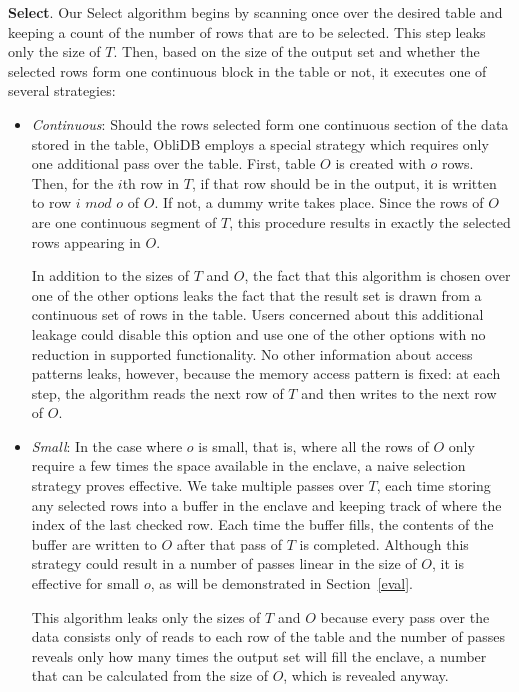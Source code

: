 \documentclass[letterpaper,twocolumn,10pt]{article}
\def\name/{ObliDB}
\begin{document}
  \noindent \textbf{Select}. 
Our Select algorithm begins by scanning once over the desired table and keeping a count of the number of rows that are to be selected. This step leaks only the size of $T$. Then, based on the size of the output set and whether the selected rows form one continuous block in the table or not, it executes one of several strategies:
\begin{itemize}[itemsep=0pt,parsep=0pt]
\item \textit{Continuous}: Should the rows selected form one continuous section of the data stored in the table, \name/ employs a special strategy which requires only one additional pass over the table. First, table $O$ is created with $o$ rows. Then, for the $i$th row in $T$, if that row should be in the output, it is written to row $i\textit{ mod }o$ of $O$. If not, a dummy write takes place. Since the rows of $O$ are one continuous segment of $T$, this procedure results in exactly the selected rows appearing in $O$. 

In addition to the sizes of $T$ and $O$, the fact that this algorithm is chosen over one of the other options leaks the fact that the result set is drawn from a continuous set of rows in the table. Users concerned about this additional leakage could disable this option and use one of the other options with no reduction in supported functionality. No other information about access patterns leaks, however, because the memory access pattern is fixed: at each step, the algorithm reads the next row of $T$ and then writes to the next row of $O$. 

\item \textit{Small}: In the case where $o$ is small, that is, where all the rows of $O$ only require a few times the space available in the enclave, a naive selection strategy proves effective. We take multiple passes over $T$, each time storing any selected rows into a buffer in the enclave and keeping track of where the index of the last checked row. Each time the buffer fills, the contents of the buffer are written to $O$ after that pass of $T$ is completed. Although this strategy could result in a number of passes linear in the size of $O$, it is effective for small $o$, as will be demonstrated in Section~\ref{eval}.

This algorithm leaks only the sizes of $T$ and $O$ because every pass over the data consists only of reads to each row of the table and the number of passes reveals only how many times the output set will fill the enclave, a number that can be calculated from the size of $O$, which is revealed anyway. 


\end{itemize}
\end{document}
